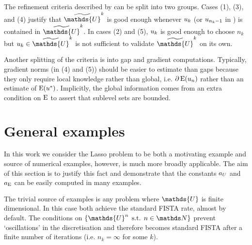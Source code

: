 \documentclass[10pt,a4paper,onecolumn]{article}
\numberwithin{equation}{section}
\let\F\mathds\let\C\mathcal\newcommand{\R}{\F{R}}\newcommand{\A}{\C{A}}
\newcommand{\op}[1]{\operatorname{#1}}\newcommand{\overtext}[2]{\stackrel{\text{#1}}{#2}}
\DeclareMathOperator{\st}{\;s.t.\;}\DeclareMathOperator{\as}{\;a.s.\;}\renewcommand{\epsilon}{\varepsilon}
\newcommand{\UCmath}[1]{%
	\begingroup
	\ucmathlist\uppercase\expandafter{#1}%
	\endgroup
}
\newcommand{\ucmathlist}{%
	\def\alpha{\mathrm{A}}%
	\def\beta{\mathrm{B}}%
	\let\gamma=\Gamma
	\let\delta=\Delta
	\def\epsilon{\mathrm{E}}%
	\def\varepsilon{\mathrm{E}}%
	\def\zeta{\mathrm{Z}}%
	\def\eta{\mathrm{H}}%
	\let\theta=\Theta
	\let\vartheta=\Theta
	\def\iota{\mathrm{I}}%
	\def\kappa{\mathrm{K}}%
	\let\lambda=\Lambda
	\def\mu{\mathrm{M}}%
	\def\nu{\mathrm{N}}%
	\let\xi=\Xi
	\let\pi=\Pi
	\let\varpi=\Pi
	\def\rho{\mathrm{P}}%
	\def\varrho{\mathrm{P}}%
	\let\sigma=\Sigma
	\def\tau{\mathrm{T}}%
	\let\upsilon=\Upsilon
	\let\phi=\Phi
	\let\varphi=\Phi
	\def\chi{\mathrm{X}}%
	\let\psi=\Psi
	\let\omega=\Omega
}
\newcommand{\caps}[1]{\UCmath{#1}}
\newcommand*{\Func}[1]{%
	\IfEqCase{#1}{%
		{0}{\op{E}}%
		{1}{\op{F}}%
		{2}{\op{G}}%
		{3}{\op{H}}%
	}[\op{F}#1]%
}
\newcommand*{\varf}[1]{%
	\IfEqCase{#1}{%
		{0}{u}%
		{1}{v}%
		{2}{w}%
	}[u#1]%
}
\newcommand*{\spcf}[1]{%
	\IfEqCase{#1}{%
		{0}{\F{U}}%
		{1}{\F{V}}%
		{2}{\F{W}}%
	}[\F{U}#1]%
}
\newcommand*{\vars}[1]{%
	\IfEqCase{#1}{%
		{0}{\alpha}%
		{1}{\beta}%
		{2}{\gamma}%
		{3}{a}%
		{4}{b}%
		{5}{c}%
	}[k#1]%
}
\newcommand*{\Varf}[1]{\caps{\varf{#1}}}
\begin{document}
The refinement criteria described by  can be split into two groups. Cases (1), (3), and (4) justify that $\tilde{\spcf0}^k$ is good enough whenever $\varf0_k$ (or $\varf0_{n_k-1}$ in ) is contained in $\tilde{\spcf0}^k$. In cases (2) and (5), $\varf0_k$ is good enough to choose $n_k$ but $\varf0_k\in\tilde{\spcf0}^k$ is not sufficient to validate $\tilde{\spcf0}^k$ on its own.

Another splitting of the criteria is into gap and gradient computations. Typically, gradient norms (in (4) and (5)) should be easier to estimate than gaps because they only require local knowledge rather than global, i.e. $\partial\Func0(\varf0_n)$ rather than an estimate of $\Func0(\varf0^*)$. Implicitly, the global information comes from an extra condition on $\Func0$ to assert that sublevel sets are bounded.

\section{General examples}\label{sec:ca: general examples}
In this work we consider the Lasso problem to be both a motivating example and source of numerical examples, however,  is much more broadly applicable. The aim of this section is to justify this fact and demonstrate that the constants $\vars3_{\Varf0}$ and $\vars3_{\Func0}$ can be easily computed in many examples. 

The trivial source of examples is any problem where $\spcf0$ is finite dimensional. In this case  both achieve the standard FISTA rate, almost by default. The conditions on $\{\spcf0^n\st n\in\F N\}$ prevent `oscillations' in the discretisation and therefore  becomes standard FISTA after a finite number of iterations (i.e. $n_k=\infty$ for some $k$).
\end{document}
